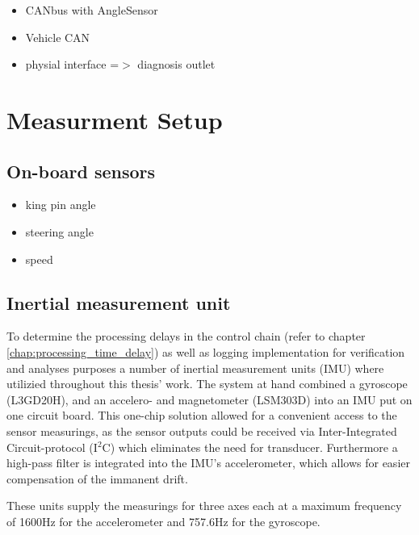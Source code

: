 \documentclass[ExampleMasters.tex]{subfiles}
\begin{document}
\begin{itemize}
	\item CANbus with AngleSensor
	\item Vehicle CAN
	\item physial interface =$>$ diagnosis outlet
\end{itemize}

\section{Measurment Setup}
\label{sec:measurement_setup}
\subsection{On-board sensors}
\begin{itemize}
	\item king pin angle
	\item steering angle 
	\item speed
\end{itemize}
\subsection{Inertial measurement unit}
\label{sec:IMU}
To determine the processing delays in the control chain (refer to chapter \ref{chap:processing_time_delay}) as well as logging implementation for verification and analyses purposes a number of inertial measurement units (IMU) where utilizied throughout this thesis' work. The system at hand combined a gyroscope (L3GD20H), and an accelero- and magnetometer (LSM303D) into an IMU put on one circuit board\cite{IMU_homepage_shop}. This one-chip solution allowed for a convenient access to the sensor measurings, as the sensor outputs could be received via Inter-Integrated Circuit-protocol (I$^{2}$C)  which eliminates the need for transducer. Furthermore a high-pass filter is integrated into the IMU's accelerometer, which allows for easier compensation of the immanent drift. 

These units supply the measurings for three axes each at a maximum frequency of 1600Hz for the accelerometer and 757.6Hz for the gyroscope. \cite{accelerometer_datasheet}\cite{gyrometer_datasheet}
\end{document}
